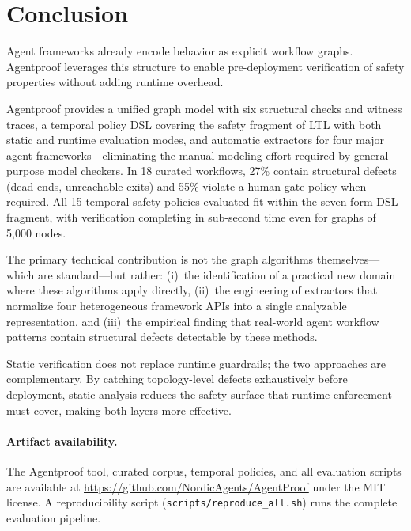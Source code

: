 \section{Conclusion}
\label{sec:conclusion}

Agent frameworks already encode behavior as explicit workflow graphs.
Agentproof leverages this structure to enable pre-deployment verification of
safety properties without adding runtime overhead.

Agentproof provides a unified graph model with six structural
checks and witness traces, a temporal policy DSL covering the safety
fragment of LTL with both static and runtime evaluation modes, and
automatic extractors for four major agent frameworks---eliminating the
manual modeling effort required by general-purpose model checkers. In 18 curated workflows, 27\% contain
structural defects (dead ends, unreachable exits) and 55\% violate a
human-gate policy when required. All 15 temporal safety policies
evaluated fit within the seven-form DSL fragment, with verification
completing in sub-second time even for graphs of 5{,}000 nodes.

The primary technical contribution is not the graph algorithms
themselves---which are standard---but rather: (i)~the identification of
a practical new domain where these algorithms apply directly,
(ii)~the engineering of extractors that normalize four heterogeneous
framework APIs into a single analyzable representation, and (iii)~the
empirical finding that real-world agent workflow patterns contain
structural defects detectable by these methods.

Static verification does not replace runtime guardrails; the two
approaches are complementary. By catching topology-level defects
exhaustively before deployment, static analysis reduces the safety
surface that runtime enforcement must cover, making both layers more
effective.

\paragraph{Artifact availability.}
The Agentproof tool, curated corpus, temporal policies, and
all evaluation scripts are available at
\url{https://github.com/NordicAgents/AgentProof} under the MIT
license. A reproducibility script
(\texttt{scripts/reproduce\_all.sh}) runs the complete evaluation
pipeline.

